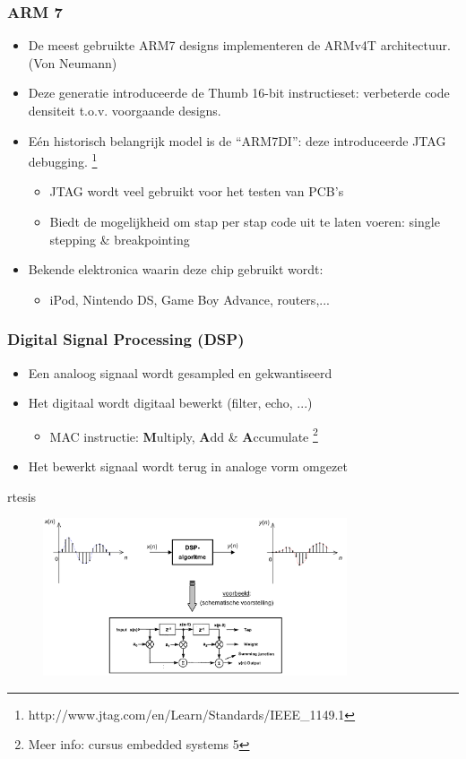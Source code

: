 \documentclass{beamer}
\begin{document}
\begin{frame} 
\frametitle{ARM 7}
\begin{itemize}
 \item <1-> De meest gebruikte ARM7 designs implementeren de ARMv4T architectuur. (Von Neumann)
 \item <2-> Deze generatie introduceerde de Thumb 16-bit instructieset: verbeterde code densiteit t.o.v. voorgaande designs.
 \item <3-> E\'en historisch belangrijk model is de ``ARM7DI'': deze introduceerde JTAG debugging. \footnote{http://www.jtag.com/en/Learn/Standards/IEEE\_1149.1}
      \begin{itemize}
      \item JTAG wordt veel gebruikt voor het testen van PCB's
      \item Biedt de mogelijkheid om stap per stap code uit te laten voeren: single stepping \& breakpointing
      \end{itemize}
 \item <4-> Bekende elektronica waarin deze chip gebruikt wordt:
      \begin{itemize}
      \item iPod, Nintendo DS, Game Boy Advance, routers,...
      \end{itemize}
\end{itemize}
\end{frame}

\begin{frame} 
\frametitle{Digital Signal Processing (DSP)}
\begin{itemize}
 \item <1-> Een analoog signaal wordt gesampled en gekwantiseerd
 \item <2-> Het digitaal wordt digitaal bewerkt (filter, echo, ...)
    \begin{itemize}
     \item <3-> MAC instructie: \textbf{M}ultiply, \textbf{A}dd \& \textbf{A}ccumulate \footnote{Meer info: cursus embedded systems 5}
    \end{itemize}
 \item <4-> Het bewerkt signaal wordt terug in analoge vorm omgezet
\end{itemize}rtesis
\begin{figure}[h] \begin{center}
\includegraphics[width=0.8\textwidth]{figures/dsp.png}
\end{center} \end{figure}
\end{frame}
\end{document}
